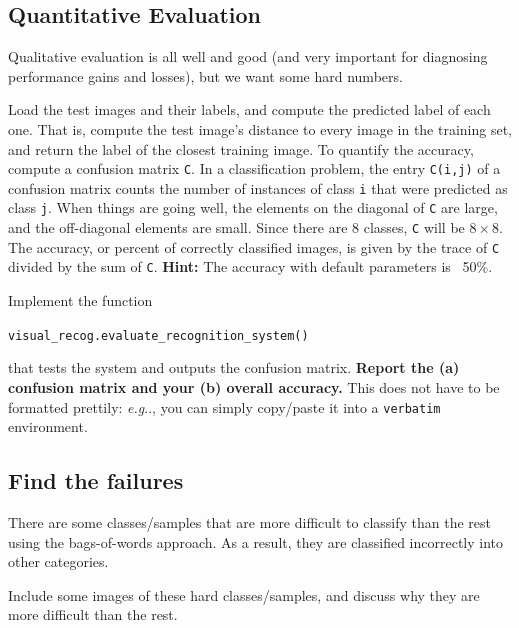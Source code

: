 \documentclass[11pt]{article}
\makeatletter
\numberwithin{equation}{section} %
\numberwithin{figure}{section} %
\numberwithin{table}{section} %
\DeclareRobustCommand\onedot{\futurelet\@let@token\@onedot}
\def\@onedot{\ifx\@let@token.\else.\null\fi\xspace}
\def\eg{\emph{e.g}\onedot} \def\Eg{\emph{E.g}\onedot}
\makeatother
\begin{document}
\subsection{Quantitative Evaluation}

Qualitative evaluation is all well and good (and very important
for diagnosing performance gains and losses), but we want some hard numbers.

Load the test images and their labels, and compute the predicted
label of each one. That is, compute the test image's distance to every image in the training set, and return the label of the closest training image. To quantify the accuracy, compute a confusion matrix {\tt C}. In a classification problem, the entry {\tt C(i,j)} of a confusion matrix counts the number of instances of class {\tt i} that were predicted as class {\tt j}. When things are going well, the elements on the diagonal of {\tt C} are large, and the off-diagonal elements are small. Since there are 8 classes, {\tt C} will be $8 \times 8$. The accuracy, or percent of correctly classified images, is given by the trace of {\tt C} divided by the sum of {\tt C}. \textbf{Hint:} The accuracy with default parameters is ~50\%.
 \\

\par {}
Implement the function
\begin{center}
{\tt visual\_recog.evaluate\_recognition\_system()} 
\end{center}
that tests the system and outputs the confusion matrix.
{\bf Report the (a) confusion matrix and your (b) overall accuracy.} This does not have to be formatted prettily: \eg, you can simply copy/paste it into a {\tt verbatim} environment. 

\begin{your_solution}[title=Q2.5 (a) (b), height=10cm]
\end{your_solution}

\subsection{Find the failures}
There are some classes/samples that are more difficult to classify than the rest using the bags-of-words approach. As a result, they are classified incorrectly into other categories.\\

\par {}
Include some images of these hard classes/samples, and discuss why they are more difficult than the rest. 
\end{document}

